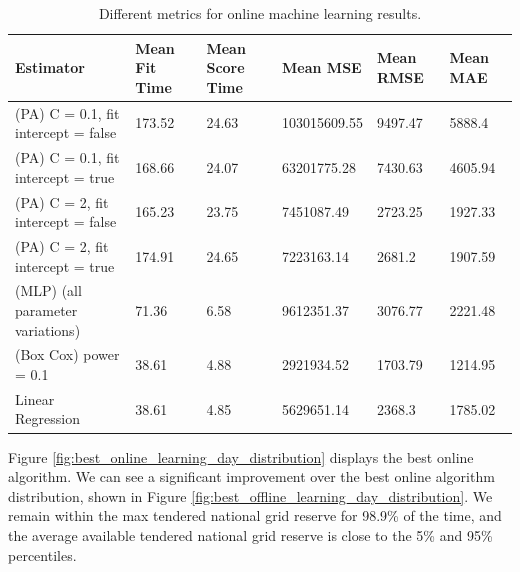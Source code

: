 \documentclass[final,3p,times,twocolumn,numbers]{elsarticle}
\begin{document}
\begin{table}[]
\centering
\footnotesize
\begin{tabular}{@{}llllll@{}}
\toprule
Estimator                                                                          & Mean Fit Time & Mean Score Time & Mean MSE     & Mean RMSE & Mean MAE \\ \midrule
(PA) C = 0.1, fit intercept = false & 173.52        & 24.63           & 103015609.55 & 9497.47   & 5888.4   \\
(PA) C = 0.1, fit intercept = true     & 168.66        & 24.07           & 63201775.28  & 7430.63   & 4605.94  \\
(PA) C = 2, fit intercept = false      & 165.23        & 23.75           & 7451087.49   & 2723.25   & 1927.33  \\
(PA) C = 2, fit intercept = true       & 174.91        & 24.65           & 7223163.14   & 2681.2    & 1907.59  \\
(MLP) (all parameter variations)                                                     & 71.36         & 6.58            & 9612351.37   & 3076.77   & 2221.48  \\
(Box Cox) power = 0.1                                                              & 38.61         & 4.88            & 2921934.52   & 1703.79   & 1214.95  \\
Linear Regression                                                                  & 38.61         & 4.85            & 5629651.14   & 2368.3    & 1785.02  \\ \bottomrule
\end{tabular}
	\caption{Different metrics for online machine learning results.}
	\label{table:online_ml_metrics}
\end{table}




Figure \ref{fig:best_online_learning_day_distribution} displays the best online algorithm. We can see a significant improvement over the best online algorithm distribution, shown in Figure \ref{fig:best_offline_learning_day_distribution}. We remain within the max tendered national grid reserve for 98.9\% of the time, and the average available tendered national grid reserve is close to the 5\% and 95\% percentiles.
\end{document}
